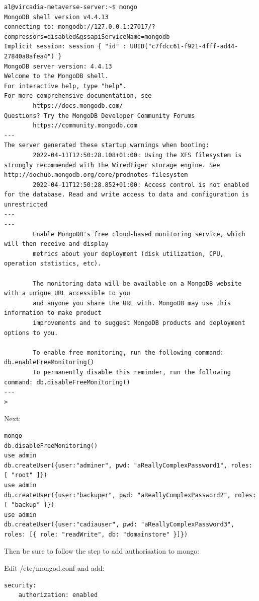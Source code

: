 \begin{verbatim}
al@vircadia-metaverse-server:~$ mongo
MongoDB shell version v4.4.13
connecting to: mongodb://127.0.0.1:27017/?compressors=disabled&gssapiServiceName=mongodb
Implicit session: session { "id" : UUID("c7fdcc61-f921-4fff-ad44-27840a8afea4") }
MongoDB server version: 4.4.13
Welcome to the MongoDB shell.
For interactive help, type "help".
For more comprehensive documentation, see
        https://docs.mongodb.com/
Questions? Try the MongoDB Developer Community Forums
        https://community.mongodb.com
---
The server generated these startup warnings when booting:
        2022-04-11T12:50:28.108+01:00: Using the XFS filesystem is strongly recommended with the WiredTiger storage engine. See http://dochub.mongodb.org/core/prodnotes-filesystem
        2022-04-11T12:50:28.852+01:00: Access control is not enabled for the database. Read and write access to data and configuration is unrestricted
---
---
        Enable MongoDB's free cloud-based monitoring service, which will then receive and display
        metrics about your deployment (disk utilization, CPU, operation statistics, etc).

        The monitoring data will be available on a MongoDB website with a unique URL accessible to you
        and anyone you share the URL with. MongoDB may use this information to make product
        improvements and to suggest MongoDB products and deployment options to you.

        To enable free monitoring, run the following command: db.enableFreeMonitoring()
        To permanently disable this reminder, run the following command: db.disableFreeMonitoring()
---
>
\end{verbatim}

Next:

\begin{verbatim}
mongo
db.disableFreeMonitoring()
use admin
db.createUser({user:"adminer", pwd: "aReallyComplexPassword1", roles: [ "root" ]})
use admin
db.createUser({user:"backuper", pwd: "aReallyComplexPassword2", roles: [ "backup" ]})
use admin
db.createUser({user:"cadiauser", pwd: "aReallyComplexPassword3", roles: [{ role: "readWrite", db: "domainstore" }]})
\end{verbatim}

Then be sure to follow the step to add authorisation to mongo:

Edit /etc/mongod.conf and add:

\begin{verbatim}
security:
    authorization: enabled
\end{verbatim}

